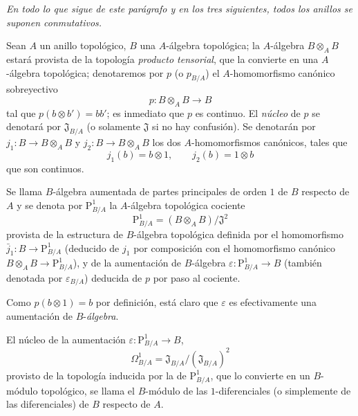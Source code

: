 \textit{En todo lo que sigue de este parágrafo y en los tres siguientes, todos los
anillos se suponen conmutativos.}

\begin{env}[20.4.1]
\label{0.20.4.1-fr}
Sean $A$ un anillo topológico, $B$ una $A$-álgebra topológica; la
$A$-álgebra $B\otimes_A B$ estará provista de la topología \emph{producto
tensorial}, que la convierte en una $A$-álgebra topológica; denotaremos por $p$
(o $p_{B/A}$) el $A$-homomorfismo canónico sobreyectivo
\begin{equation}
\tag{20.4.1.1}
\label{0.20.4.1.1-fr}
  p:B\otimes_A B\to B
\end{equation}
tal que $p(b\otimes b')=bb'$; es inmediato que $p$ es continuo. El
\emph{núcleo} de $p$ se denotará por $\mathfrak{J}_{B/A}$ (o solamente
$\mathfrak{J}$ si no hay confusión). Se denotarán por
$j_1:B\to B\otimes_A B$ y $j_2:B\to B\otimes_A B$ los dos
$A$-homomorfismos canónicos, tales que
\[
  j_1(b)=b\otimes1, \qquad j_2(b)=1\otimes b
\]
que son continuos.
\end{env}

\begin{definition}[20.4.2]
\label{0.20.4.2-fr}
Se llama $B$-álgebra aumentada de partes principales de orden $1$ de
$B$ respecto de $A$ y se denota por $\mathrm{P}^1_{B/A}$ la $A$-álgebra
topológica cociente
\begin{equation}
\tag{20.4.2.1}
\label{0.20.4.2.1-fr}
  \mathrm{P}^1_{B/A}=(B\otimes_A B)/\mathfrak{J}^2
\end{equation}
provista de la estructura de $B$-álgebra topológica definida por el homomorfismo
$\bar{j}_1:B\to\mathrm{P}^1_{B/A}$ (deducido de $j_1$ por composición con
el homomorfismo canónico $B\otimes_A B\to\mathrm{P}^1_{B/A}$), y de
la aumentación de $B$-álgebra $\varepsilon:\mathrm{P}^1_{B/A}\to B$ (también
denotada por $\varepsilon_{B/A}$) deducida de $p$ por paso al cociente.
\end{definition}

Como $p(b\otimes1)=b$ por definición, está claro que $\varepsilon$ es
efectivamente una aumentación de $B$-\emph{álgebra}.

\begin{definition}[20.4.3]
\label{0.20.4.3-fr}
El núcleo de la aumentación $\varepsilon:\mathrm{P}^1_{B/A}\to B$,
\begin{equation}
\tag{20.4.3.1}
\label{0.20.4.3.1-fr}
  \Omega^1_{B/A}=\mathfrak{J}_{B/A}/(\mathfrak{J}_{B/A})^2
\end{equation}
provisto de la topología inducida por la de $\mathrm{P}^1_{B/A}$, que lo convierte
en un $B$-módulo topológico, se llama el $B$-módulo de las
$1$-diferenciales \textup{(o simplemente de las} diferenciales) de $B$
respecto de $A$.
\end{definition}

